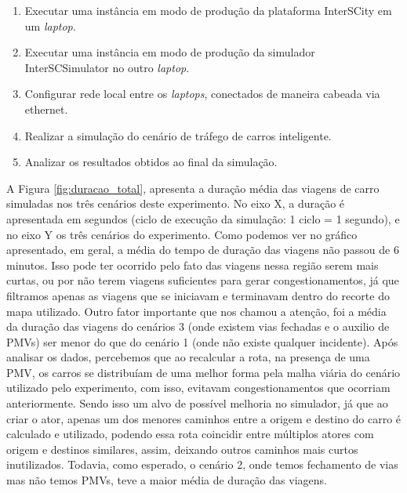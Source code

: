 \begin{enumerate}
    \item Executar uma instância em modo de produção da plataforma InterSCity em um \textit{laptop}.

    \item Executar uma instância em modo de produção da simulador InterSCSimulator no outro \textit{laptop}.

    \item Configurar rede local entre os \textit{laptops}, conectados de maneira cabeada via ethernet.

    \item Realizar a simulação do cenário de tráfego de carros inteligente.

    \item Analizar os resultados obtidos ao final da simulação.
\end{enumerate}

A Figura \ref{fig:duracao_total}, apresenta a duração média das viagens de carro simuladas nos três cenários deste experimento.
No eixo X, a duração é apresentada em segundos (ciclo de execução da simulação: 1 ciclo = 1 segundo), e no eixo Y os três cenários do experimento.
Como podemos ver no gráfico apresentado, em geral, a média do tempo de duração das viagens não passou de 6 minutos.
Isso pode ter ocorrido pelo fato das viagens nessa região serem mais curtas, ou por não terem viagens suficientes para gerar congestionamentos, já que filtramos apenas as viagens que se iniciavam e
terminavam dentro do recorte do mapa utilizado.
Outro fator importante que nos chamou a atenção, foi a média da duração das viagens do cenários 3 (onde existem vias fechadas e o auxilio de PMVs) ser menor do que do cenário 1 (onde não existe qualquer
incidente).
Após analisar os dados, percebemos que ao recalcular a rota, na presença de uma PMV, os carros se distribuíam de uma melhor forma pela malha viária do cenário utilizado pelo experimento, com isso,
evitavam congestionamentos que ocorriam anteriormente.
Sendo isso um alvo de possível melhoria no simulador, já que ao criar o ator, apenas um dos menores caminhos entre a origem e destino do carro é calculado e utilizado, podendo essa rota coincidir entre
múltiplos atores com origem e destinos similares, assim, deixando outros caminhos mais curtos inutilizados.
Todavia, como esperado, o cenário 2, onde temos fechamento de vias mas não temos PMVs, teve a maior média de duração das viagens.

